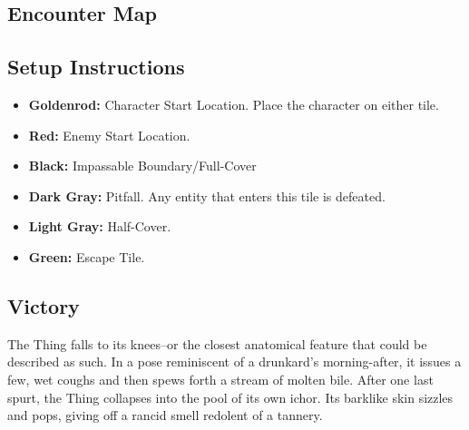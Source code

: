 \subsection*{Encounter Map}
\begin{center}
\end{center}

\subsection*{Setup Instructions}
\begin{itemize}
\item \textbf{Goldenrod:} Character Start Location. Place the character on either tile.
\item \textbf{Red:} Enemy Start Location.
\item \textbf{Black:} Impassable Boundary/Full-Cover
\item \textbf{Dark Gray:} Pitfall. Any entity that enters this tile is defeated.
\item \textbf{Light Gray:} Half-Cover.
\item \textbf{Green:} Escape Tile.
\end{itemize}

\pagebreak

\subsection*{Victory}
The Thing falls to its knees--or the closest anatomical feature that could be described as such. In a pose reminiscent of a drunkard’s morning-after, it issues a few, wet coughs and then spews forth a stream of molten bile. After one last spurt, the Thing collapses into the pool of its own ichor. Its barklike skin sizzles and pops, giving off a rancid smell redolent of a tannery.\\


